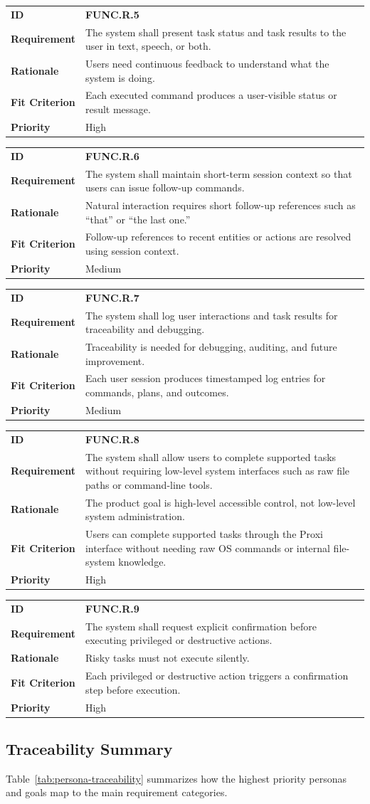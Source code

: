 \documentclass[12pt]{article}
\makeatletter
\newcommand{\reqcard}[5]{%
\noindent\begin{tabularx}{\textwidth}{@{}p{2.35cm}X@{}}
\textbf{ID} & \textbf{#1} \\
\textbf{Requirement} & #2 \\
\textbf{Rationale} & #3 \\
\textbf{Fit Criterion} & #4 \\
\textbf{Priority} & #5 \\
\end{tabularx}\par\medskip
}
\makeatother
\begin{document}
\reqcard{FUNC.R.5}{The system shall present task status and task
results to the user in text, speech, or both.}{Users need continuous
feedback to understand what the system is doing.}{Each executed command
produces a user-visible status or result message.}{High}

\reqcard{FUNC.R.6}{The system shall maintain short-term session context
so that users can issue follow-up commands.}{Natural interaction
requires short follow-up references such as ``that'' or ``the last
one.''}{Follow-up references to recent entities or actions are resolved
using session context.}{Medium}

\reqcard{FUNC.R.7}{The system shall log user interactions and task
results for traceability and debugging.}{Traceability is needed for
debugging, auditing, and future improvement.}{Each user session
produces timestamped log entries for commands, plans, and
outcomes.}{Medium}

\reqcard{FUNC.R.8}{The system shall allow users to complete supported
tasks without requiring low-level system interfaces such as raw file
paths or command-line tools.}{The product goal is high-level
accessible control, not low-level system administration.}{Users can
complete supported tasks through the Proxi interface without needing
raw OS commands or internal file-system knowledge.}{High}

\reqcard{FUNC.R.9}{The system shall request explicit confirmation
before executing privileged or destructive actions.}{Risky tasks must
not execute silently.}{Each privileged or destructive action triggers a
confirmation step before execution.}{High}

\subsection{Traceability Summary}
Table~\ref{tab:persona-traceability} summarizes how the highest
priority personas and goals map to the main requirement categories.
\end{document}
